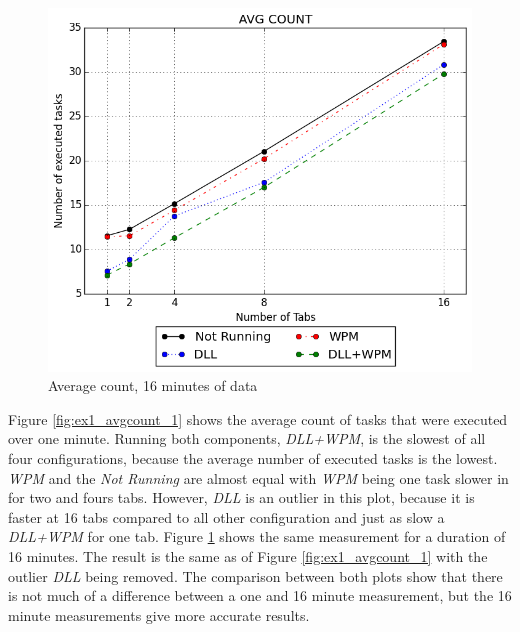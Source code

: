 \begin{figure}[!htbp]
	\centering
    \includegraphics[width=\textwidth,keepaspectratio]{Evaluation/experiment1/AVG-COUNT-16.png}
    \caption{Average count, 16 minutes of data}
    \label{fig:ex1_avgcount_16}
\end{figure}
Figure \ref{fig:ex1_avgcount_1} shows the average count of tasks that were executed over one minute. Running both components, \emph{\gls{DLL}+\gls{WPM}}, is the slowest of all four configurations, because the average number of executed tasks is the lowest. \emph{WPM} and the \emph{Not Running} are almost equal with \emph{\gls{WPM}} being one task slower in for two and fours tabs. However, \emph{\gls{DLL}} is an outlier in this plot, because it is faster at 16 tabs compared to all other configuration and just as slow a \emph{\gls{DLL}+\gls{WPM}} for one tab. Figure \ref{fig:ex1_avgcount_16} shows the same measurement for a duration of 16 minutes. The result is the same as of Figure \ref{fig:ex1_avgcount_1} with the outlier \emph{\gls{DLL}} being removed. The comparison between both plots show that there is not much of a difference between a one and 16 minute measurement, but the 16 minute measurements give more accurate results.
